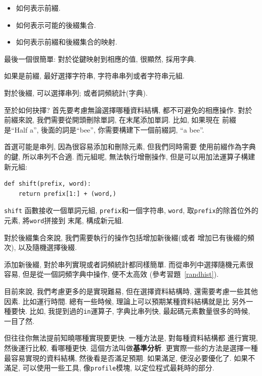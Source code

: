 \documentclass[10pt]{book}
\begin{document}
\begin{itemize}

\item 如何表示前綴.

\item 如何表示可能的後綴集合.

\item 如何表示前綴和後綴集合的映射.

\end{itemize}

最後一個很簡單: 對於從鍵映射到相應的值, 很顯然, 採用字典. 

如果是前綴, 最好選擇字符串, 字符串串列或者字符串元組. 

對於後綴, 可以選擇串列; 或者詞頻統計(字典).

至於如何抉擇? 首先要考慮無論選擇哪種資料結構, 都不可避免的相應操作. 
對於前綴來說, 我們需要從開頭刪除單詞, 在末尾添加單詞. 比如, 如果現在
前綴是``Half a'', 後面的詞是``bee'',  你需要構建下一個前綴詞, ``a bee''. 

首選可能是串列, 因為很容易添加和刪除元素, 但我們同時需要
使用前綴作為字典的鍵, 所以串列不合適. 
而元組呢, 無法執行增刪操作, 
但是可以用加法運算子構建新元組:

\begin{verbatim}
def shift(prefix, word):
    return prefix[1:] + (word,)
\end{verbatim}
%

{\tt shift} 函數接收一個單詞元組, {\tt prefix}和一個字符串, 
{\tt word}, 取{\tt prefix}的除首位外的元素, 將{\tt word}拼接到
末尾, 構成新元組. 

對於後綴集合來說, 我們需要執行的操作包括增加新後綴(或者
增加已有後綴的頻次), 以及隨機選擇後綴. 

添加新後綴, 對於串列實現或者詞頻統計都同樣簡單. 
而從串列中選擇隨機元素很容易, 但是從一個詞頻字典中操作, 便不太高效
(參考習題~\ref{randhist}). 

目前來說, 我們考慮更多的是實現難易, 
但在選擇資料結構時, 還需要考慮一些其他因素. 
比如運行時間. 總有一些時候, 理論上可以預期某種資料結構就是比
另外一種要快. 比如, 我提到過的{\tt in}運算子, 字典比串列快, 
最起碼元素數量很多的時候, 一目了然. 

但往往你無法提前知曉哪種實現要更快. 一種方法是, 對每種資料結構都
進行實現, 然後運行比較, 看哪種更快. 這個方法叫做{\bf 基準分析}.
更實際一些的方法是選擇一種最容易實現的資料結構, 
然後看是否滿足預期. 如果滿足, 便沒必要優化了. 如果不滿足, 
可以使用一些工具, 像{\tt profile}模塊, 以定位程式最耗時的部分. 
\end{document}
